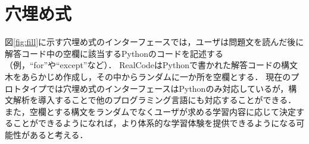 \section{穴埋め式}

図\ref{fig:fill}に示す穴埋め式のインターフェースでは，ユーザは問題文を読んだ後に解答コード中の空欄に該当するPythonのコードを記述する（例，``for''や``except''など）．
RealCodeはPythonで書かれた解答コードの構文木をあらかじめ作成し，その中からランダムに一か所を空欄とする．
現在のプロトタイプでは穴埋め式のインターフェースはPythonのみ対応しているが，構文解析を導入することで他のプログラミング言語にも対応することができる．
また，空欄とする構文をランダムでなくユーザが求める学習内容に応じて決定することができるようになれば，より体系的な学習体験を提供できるようになる可能性があると考える．


